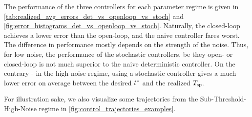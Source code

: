 \documentclass[12pt]{iopart}
\begin{document}
The performance of the three controllers for each parameter regime is given in
\cref{tab:realized_avg_errors_det_vs_openloop_vs_stoch} and
\cref{fig:error_histograms_det_vs_openloop_vs_stoch}. Naturally, the closed-loop
achieves a lower error than the open-loop, and the naive controller fares worst.
The difference in performance mostly depends on the strength of the noise. Thus,
for low noise, the performance of the stochastic controllers, be they open- or
closed-loop is not much superior to the naive deterministic controller. On the
contrary - in the high-noise regime, using a stochastic controller gives a much
lower error on average between the desired ${ t^* }$ and the realized ${ T_{\textrm{sp} } }$.

For illustration sake, we also visualize some trajectories from the
Sub-Threshold-High-Noise regime in \cref{fig:control_trajectories_examples}.

\begin{table}[h]
\begin{center}
\\
\\
 \\
 \\
\caption{TODO(ALEX): THIS TABLE IS MOSTLY A SANITY CHECK TO SEE THAT THE CODE
WORKS - CONSIDER OMITTTING IN DRAFT.
Realized and theoretical performance of the different control laws. The
empirical performance is obtained using $N=10000$ sample paths. The theoretical
performance is found using the optimal value for $J$ for the open-loop
stochastic control and the value function $\v(x=0, t =0)$ for the closed-loop
stochastic control.}
\label{tab:realized_avg_errors_det_vs_openloop_vs_stoch}
\end{center}
\end{table}
\end{document}
